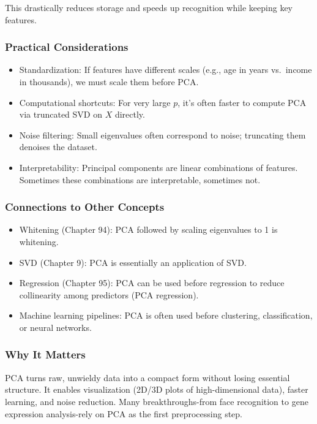 \documentclass[
  letterpaper,
  DIV=11,
  numbers=noendperiod]{scrreprt}
\providecommand{\tightlist}{%
  \setlength{\itemsep}{0pt}\setlength{\parskip}{0pt}}
\begin{document}
This drastically reduces storage and speeds up recognition while keeping
key features.

\subsubsection{Practical Considerations}\label{practical-considerations}

\begin{itemize}
\tightlist
\item
  Standardization: If features have different scales (e.g., age in years
  vs.~income in thousands), we must scale them before PCA.
\item
  Computational shortcuts: For very large \(p\), it's often faster to
  compute PCA via truncated SVD on \(X\) directly.
\item
  Noise filtering: Small eigenvalues often correspond to noise;
  truncating them denoises the dataset.
\item
  Interpretability: Principal components are linear combinations of
  features. Sometimes these combinations are interpretable, sometimes
  not.
\end{itemize}

\subsubsection{Connections to Other
Concepts}\label{connections-to-other-concepts}

\begin{itemize}
\tightlist
\item
  Whitening (Chapter 94): PCA followed by scaling eigenvalues to 1 is
  whitening.
\item
  SVD (Chapter 9): PCA is essentially an application of SVD.
\item
  Regression (Chapter 95): PCA can be used before regression to reduce
  collinearity among predictors (PCA regression).
\item
  Machine learning pipelines: PCA is often used before clustering,
  classification, or neural networks.
\end{itemize}

\subsubsection{Why It Matters}\label{why-it-matters-91}

PCA turns raw, unwieldy data into a compact form without losing
essential structure. It enables visualization (2D/3D plots of
high-dimensional data), faster learning, and noise reduction. Many
breakthroughs-from face recognition to gene expression analysis-rely on
PCA as the first preprocessing step.
\end{document}
